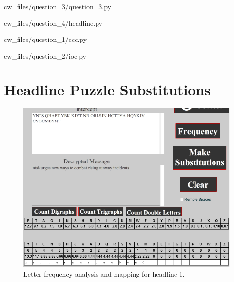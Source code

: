\documentclass[12pt,a4paper,onecolumn]{article}
\begin{document}

					{cw_files/question_3/question_3.py}

					{cw_files/question_4/headline.py}


					{cw_files/question_1/ecc.py}

\pagebreak

					{cw_files/question_2/ioc.py}
\pagebreak										

\section{Headline Puzzle Substitutions}
\label{headline_images}

	\begin{figure}[h]
		\center
		\includegraphics[scale=0.7]{cw_files/question_4/q1/q1_sol.png}
		\caption{Letter frequency analysis and mapping for headline 1.}
	\end{figure}
\end{document}

